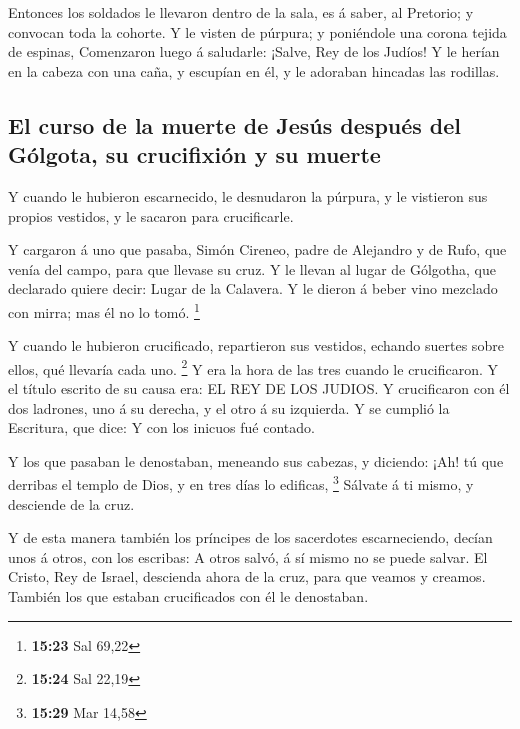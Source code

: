  Entonces los soldados le llevaron dentro de la sala, es
á saber, al Pretorio; y convocan toda la cohorte.  Y le
visten de púrpura; y poniéndole una corona tejida de espinas,
 Comenzaron luego á saludarle: ¡Salve, Rey de los Judíos!
 Y le herían en la cabeza con una caña, y escupían en él,
y le adoraban hincadas las rodillas.

\hypertarget{el-curso-de-la-muerte-de-jesuxfas-despuuxe9s-del-guxf3lgota-su-crucifixiuxf3n-y-su-muerte}{%
\subsection{El curso de la muerte de Jesús después del Gólgota, su
crucifixión y su
muerte}\label{el-curso-de-la-muerte-de-jesuxfas-despuuxe9s-del-guxf3lgota-su-crucifixiuxf3n-y-su-muerte}}

 Y cuando le hubieron escarnecido, le desnudaron la
púrpura, y le vistieron sus propios vestidos, y le sacaron para
crucificarle.

 Y cargaron á uno que pasaba, Simón Cireneo, padre de
Alejandro y de Rufo, que venía del campo, para que llevase su cruz.
 Y le llevan al lugar de Gólgotha, que declarado quiere
decir: Lugar de la Calavera.  Y le dieron á beber vino
mezclado con mirra; mas él no lo tomó. \footnote{\textbf{15:23} Sal
  69,22}

 Y cuando le hubieron crucificado, repartieron sus
vestidos, echando suertes sobre ellos, qué llevaría cada uno.
\footnote{\textbf{15:24} Sal 22,19}  Y era la hora de las
tres cuando le crucificaron.  Y el título escrito de su
causa era: EL REY DE LOS JUDIOS.  Y crucificaron con él
dos ladrones, uno á su derecha, y el otro á su izquierda.
 Y se cumplió la Escritura, que dice: Y con los inicuos
fué contado.

 Y los que pasaban le denostaban, meneando sus cabezas, y
diciendo: ¡Ah! tú que derribas el templo de Dios, y en tres días lo
edificas, \footnote{\textbf{15:29} Mar 14,58}  Sálvate á
ti mismo, y desciende de la cruz.

 Y de esta manera también los príncipes de los sacerdotes
escarneciendo, decían unos á otros, con los escribas: A otros salvó, á
sí mismo no se puede salvar.  El Cristo, Rey de Israel,
descienda ahora de la cruz, para que veamos y creamos. También los que
estaban crucificados con él le denostaban.

